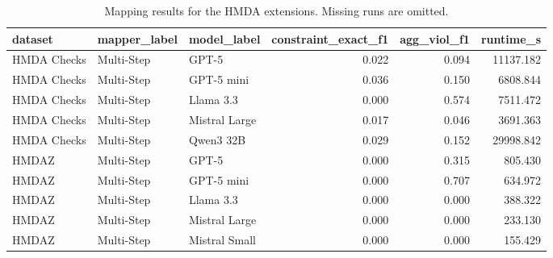 \begin{table}
\caption{Mapping results for the HMDA extensions. Missing runs are omitted.}
\label{tab:mapping-hmda-results}
\begin{tabular}{lllrrr}
\toprule
dataset & mapper_label & model_label & constraint_exact_f1 & agg_viol_f1 & runtime_s \\
\midrule
HMDA Checks & Multi-Step & GPT-5 & 0.022 & 0.094 & 11137.182 \\
HMDA Checks & Multi-Step & GPT-5 mini & 0.036 & 0.150 & 6808.844 \\
HMDA Checks & Multi-Step & Llama 3.3 & 0.000 & 0.574 & 7511.472 \\
HMDA Checks & Multi-Step & Mistral Large & 0.017 & 0.046 & 3691.363 \\
HMDA Checks & Multi-Step & Qwen3 32B & 0.029 & 0.152 & 29998.842 \\
HMDAZ & Multi-Step & GPT-5 & 0.000 & 0.315 & 805.430 \\
HMDAZ & Multi-Step & GPT-5 mini & 0.000 & 0.707 & 634.972 \\
HMDAZ & Multi-Step & Llama 3.3 & 0.000 & 0.000 & 388.322 \\
HMDAZ & Multi-Step & Mistral Large & 0.000 & 0.000 & 233.130 \\
HMDAZ & Multi-Step & Mistral Small & 0.000 & 0.000 & 155.429 \\
\bottomrule
\end{tabular}
\end{table}
